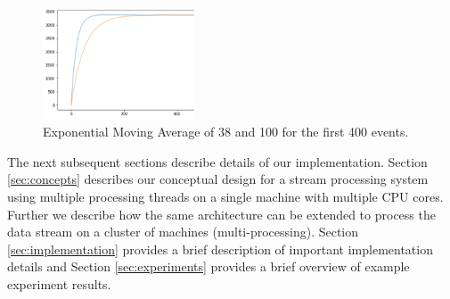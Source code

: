 
\begin{figure}[!ht]
    \begin{center}
        \includegraphics[width=0.4\textwidth]{./images/query2_example_200.png}
        \caption{Exponential Moving Average of 38 and 100 for the first 400 events.}
        \label{fig:EMA200}
    \end{center}
\end{figure}


The next subsequent sections describe details of our implementation. Section \ref{sec:concepts} describes our conceptual design for
a stream processing system using multiple processing threads on a single machine with multiple CPU cores. Further we describe how the same
architecture can be extended to process the data stream on a cluster of machines (multi-processing).  Section \ref{sec:implementation} provides
a brief description of important implementation details and Section \ref{sec:experiments} provides a brief overview of example
experiment results.
